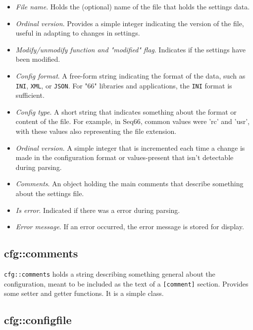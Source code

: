    \begin{itemize}
      \item \textsl{File name}.
         Holds the (optional) name of the file that holds the settings data.
      \item \textsl{Ordinal version}.
         Provides a simple integer indicating the version of the file,
         useful in adapting to changes in settings.
      \item \textsl{Modify/unmodify function and "modified" flag}.
         Indicates if the settings have been modified.
      \item \textsl{Config format}.
         A free-form string indicating the format of the data, such as
         \texttt{INI}, \texttt{XML}, or \texttt{JSON}.
         For "66" libraries and applications, the \texttt{INI}
         format is sufficient.
      \item \textsl{Config type}.
         A short string that indicates something about the
         format or content of the file. For example, in Seq66,
         common values were 'rc' and 'usr', with these
         values also representing the file extension.
      \item \textsl{Ordinal version}.
         A simple integer that is incremented each time a change is
         made in the configuration format or values-present
         that isn't detectable during parsing.
      \item \textsl{Comments}.
         An object holding the main comments that describe something
         about the settings file.
      \item \textsl{Is error}.
         Indicated if there was a error during parsing.
      \item \textsl{Error message}.
         If an error occurred, the error message is stored for display.
   \end{itemize}

\subsection{cfg::comments}
\label{subsec:cfg_namespace_comments}

   \texttt{cfg::comments} holds a string describing
   something general about the configuration,
   meant to be included as the text of a \texttt{[comment]} section.
   Provides some setter and getter functions.
   It is a simple class.

\subsection{cfg::configfile}
\label{subsec:cfg_namespace_configfile}

